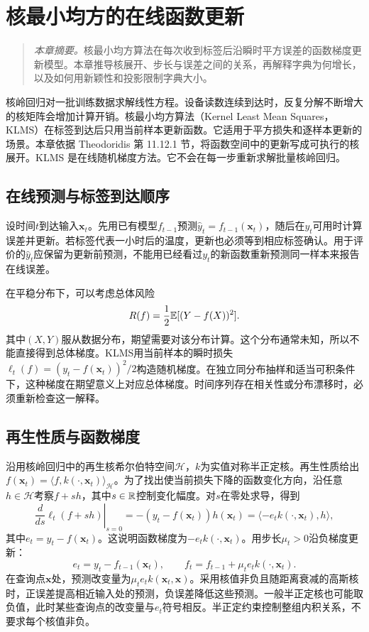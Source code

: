 \chapter{核最小均方的在线函数更新}
\label{chap:klms}
\begin{quote}\small
\textit{本章摘要。}核最小均方算法在每次收到标签后沿瞬时平方误差的函数梯度更新模型。本章推导核展开、步长与误差之间的关系，再解释字典为何增长，以及如何用新颖性和投影限制字典大小。
\end{quote}

核岭回归对一批训练数据求解线性方程。设备读数连续到达时，反复分解不断增大的核矩阵会增加计算开销。核最小均方算法（Kernel Least Mean Squares，KLMS）在标签到达后只用当前样本更新函数。它适用于平方损失和逐样本更新的场景。本章依据 Theodoridis 第 11.12.1 节\cite{theodoridis2015ml}，将函数空间中的更新写成可执行的核展开。KLMS 是在线随机梯度方法。它不会在每一步重新求解批量核岭回归。

\section{在线预测与标签到达顺序}
设时间$t$到达输入$\bm x_t$。先用已有模型$f_{t-1}$预测$\hat y_t=f_{t-1}(\bm x_t)$，随后在$y_t$可用时计算误差并更新。若标签代表一小时后的温度，更新也必须等到相应标签确认。用于评价的$\hat y_t$应保留为更新前预测，不能用已经看过$y_t$的新函数重新预测同一样本来报告在线误差。

在平稳分布下，可以考虑总体风险
\[
 R(f)=\frac12\mathbb{E}[(Y-f(X))^2].
\]
其中$(X,Y)$服从数据分布，期望需要对该分布计算。这个分布通常未知，所以不能直接得到总体梯度。KLMS用当前样本的瞬时损失$\ell_t(f)=(y_t-f(\bm x_t))^2/2$构造随机梯度。在独立同分布抽样和适当可积条件下，这种梯度在期望意义上对应总体梯度。时间序列存在相关性或分布漂移时，必须重新检查这一解释。

\section{再生性质与函数梯度}
沿用核岭回归中的再生核希尔伯特空间$\mathcal H$，$k$为实值对称半正定核。再生性质给出$f(\bm x_t)=\langle f,k(\cdot,\bm x_t)\rangle_{\mathcal H}$。为了找出使当前损失下降的函数变化方向，沿任意$h\in\mathcal H$考察$f+sh$，其中$s\in\mathbb{R}$控制变化幅度。对$s$在零处求导，得到
\begin{equation}
 \left.\frac{d}{ds}\ell_t(f+sh)\right|_{s=0}
 =-(y_t-f(\bm x_t))h(\bm x_t)
 =\langle-e_t k(\cdot,\bm x_t),h\rangle,
\end{equation}
其中$e_t=y_t-f(\bm x_t)$。这说明函数梯度为$-e_t k(\cdot,\bm x_t)$。用步长$\mu_t>0$沿负梯度更新：
\begin{equation}
 e_t=y_t-f_{t-1}(\bm x_t),\qquad
 f_t=f_{t-1}+\mu_t e_t k(\cdot,\bm x_t).
 \label{eq:klms-update}
\end{equation}
在查询点$\bm x$处，预测改变量为$\mu_te_tk(\bm x_t,\bm x)$。采用核值非负且随距离衰减的高斯核时，正误差提高相近输入处的预测，负误差降低这些预测。一般半正定核也可能取负值，此时某些查询点的改变量与$e_t$符号相反。半正定约束控制整组内积关系，不要求每个核值非负。


